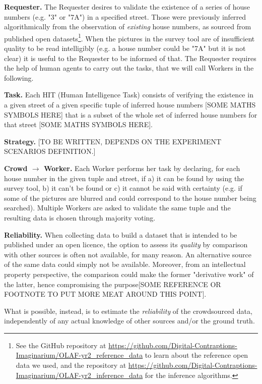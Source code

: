 \documentclass{llncs}
\begin{document}
    \textbf{Requester.} The Requester desires to validate the existence of a series of house numbers (e.g. "3" or "7A") in a specified street. Those were previously inferred algorithmically from the observation of \textit{existing} house numbers, as sourced from published open datasets\footnote{See the GitHub repository at \url{https://github.com/Digital-Contraptions-Imaginarium/OLAF-yr2_reference_data} to learn about the reference open data we used, and the repository at \url{https://github.com/Digital-Contraptions-Imaginarium/OLAF-yr2_inference_data} for the inference algorithms.}. When the pictures in the survey tool are of insufficient quality to be read intelligibly (e.g. a house number could be "7A" but it is not clear) it is useful to the Requester to be informed of that. The Requester requires the help of human agents to carry out the tasks, that we will call Workers in the following.
    
    \textbf{Task.} Each HIT (Human Intelligence Task) consists of verifying the existence in a given street of a given specific tuple of inferred house numbers {[}SOME MATHS SYMBOLS HERE{]} that is a subset of the whole set of inferred house numbers for that street {[}SOME MATHS SYMBOLS HERE{]}. 
    
    \textbf{Strategy.} 
    {[}TO BE WRITTEN, DEPENDS ON THE EXPERIMENT SCENARIOS DEFINITION.{]}
    
    \textbf{Crowd $\rightarrow$ Worker.} Each Worker performs her task by declaring, for each house number in the given tuple and street, if a) it can be found by using the survey tool, b) it can't be found or c) it cannot be said with certainty (e.g. if some of the pictures are blurred and could correspond to the house number being searched). Multiple Workers are asked to validate the same tuple and the resulting data is chosen through majority voting.
    
    \textbf{Reliability.} When collecting data to build a dataset that is intended to be published under an open licence, the option to assess its \textit{quality} by comparison with other sources is often not available, for many reason. An alternative source of the same data could simply not be available. Moreover, from an intellectual property perspective, the comparison could make the former "derivative work" of the latter, hence compromising the purpose{[}SOME REFERENCE OR FOOTNOTE TO PUT MORE MEAT AROUND THIS POINT{]}. 
    
    What is possible, instead, is to estimate the \textit{reliability} of the crowdsourced data, independently of any actual knowledge of other sources and/or the ground truth. 
    
\end{document}
